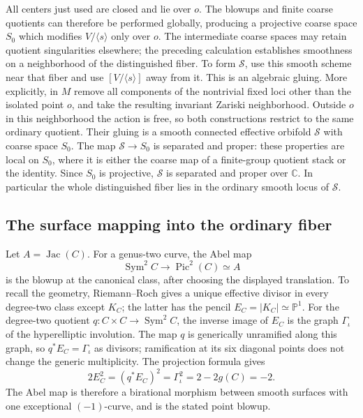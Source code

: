\documentclass[11pt,reqno]{amsart}
\numberwithin{equation}{section}
\theoremstyle{definition}
\theoremstyle{remark}
\newcommand{\C}{\mathbb C}
\newcommand{\PP}{\mathbb P}
\newcommand{\cS}{\mathcal S}
\DeclareMathOperator{\Sym}{Sym}
\DeclareMathOperator{\Jac}{Jac}
\DeclareMathOperator{\Pic}{Pic}
\begin{document}
All centers just used are closed and lie over $o$.  The blowups and
finite coarse quotients can therefore be performed globally,
producing a projective coarse space $S_0$ which modifies
$V/\langle s\rangle$ only over $o$.  The intermediate coarse spaces
may retain quotient singularities elsewhere; the preceding calculation
establishes smoothness on a neighborhood of the distinguished fiber.
To form $\cS$, use this smooth scheme near that fiber and use
$[V/\langle s\rangle]$ away from it.  This is an algebraic gluing.
More explicitly, in $M$ remove all components of the nontrivial fixed
loci other than the isolated point $o$, and take the resulting invariant
Zariski neighborhood.  Outside $o$ in this neighborhood the action is
free, so both constructions restrict to the same ordinary quotient.
Their gluing is a smooth connected effective orbifold $\cS$ with
coarse space $S_0$.  The map $\cS\to S_0$ is separated and proper:
these properties are local on $S_0$, where it is either the coarse map of a finite-group
quotient stack or the identity.  Since $S_0$ is projective,
$\cS$ is separated and proper over $\C$.  In particular the whole distinguished
fiber lies in the ordinary smooth locus of $\cS$.

\subsection{The surface mapping into the ordinary fiber}\label{geo:surface}

Let $A=\Jac(C)$.  For a genus-two curve, the Abel map
\[
        \Sym^2C\longrightarrow\Pic^2(C)\simeq A
\]
is the blowup at the canonical class, after choosing the displayed
translation.  To recall the geometry, Riemann--Roch gives a unique
effective divisor in every degree-two class except $K_C$; the latter
has the pencil $E_C=|K_C|\simeq\PP^1$.  For the degree-two quotient
$q:C\times C\to\Sym^2 C$, the inverse image of $E_C$ is the graph
$\Gamma_\iota$ of the hyperelliptic involution.  The map $q$ is generically
unramified along this graph, so $q^*E_C=\Gamma_\iota$ as divisors;
ramification at its six diagonal points does not change the generic
multiplicity.  The projection formula gives
\[
  2E_C^2=(q^*E_C)^2=\Gamma_\iota^2=2-2g(C)=-2.
\]
The Abel map is therefore a birational
morphism between smooth surfaces with one exceptional $(-1)$-curve,
and is the stated point blowup.
\end{document}
